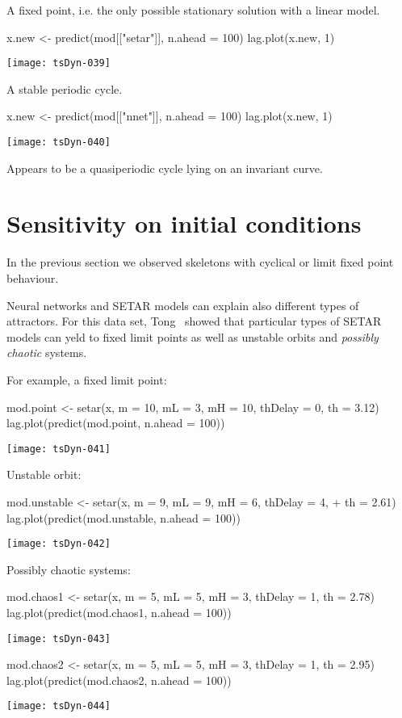 \documentclass[a4paper]{article}
\begin{document}
A fixed point, i.e. the only possible stationary solution with a linear model.
\begin{Schunk}
\begin{Sinput}
 x.new <- predict(mod[["setar"]], n.ahead = 100)
 lag.plot(x.new, 1)
\end{Sinput}
\end{Schunk}
\texttt{[image: tsDyn-039]}

A stable periodic cycle.

\begin{Schunk}
\begin{Sinput}
 x.new <- predict(mod[["nnet"]], n.ahead = 100)
 lag.plot(x.new, 1)
\end{Sinput}
\end{Schunk}
\texttt{[image: tsDyn-040]}

Appears to be a quasiperiodic cycle lying on an invariant curve.

\section{Sensitivity on initial conditions}
In the previous section we observed skeletons with cyclical or limit fixed point behaviour.

Neural networks and SETAR models can explain also different types of attractors.
For this data set, Tong~\cite{Tong1990} showed that particular types of SETAR models 
can yeld to fixed limit points as well as unstable orbits and \emph{possibly chaotic} systems.

For example, a fixed limit point:
\begin{Schunk}
\begin{Sinput}
 mod.point <- setar(x, m = 10, mL = 3, mH = 10, thDelay = 0, th = 3.12)
 lag.plot(predict(mod.point, n.ahead = 100))
\end{Sinput}
\end{Schunk}
\texttt{[image: tsDyn-041]}

Unstable orbit:
\begin{Schunk}
\begin{Sinput}
 mod.unstable <- setar(x, m = 9, mL = 9, mH = 6, thDelay = 4, 
+     th = 2.61)
 lag.plot(predict(mod.unstable, n.ahead = 100))
\end{Sinput}
\end{Schunk}
\texttt{[image: tsDyn-042]}

Possibly chaotic systems:
\begin{Schunk}
\begin{Sinput}
 mod.chaos1 <- setar(x, m = 5, mL = 5, mH = 3, thDelay = 1, th = 2.78)
 lag.plot(predict(mod.chaos1, n.ahead = 100))
\end{Sinput}
\end{Schunk}
\texttt{[image: tsDyn-043]}
\begin{Schunk}
\begin{Sinput}
 mod.chaos2 <- setar(x, m = 5, mL = 5, mH = 3, thDelay = 1, th = 2.95)
 lag.plot(predict(mod.chaos2, n.ahead = 100))
\end{Sinput}
\end{Schunk}
\texttt{[image: tsDyn-044]}
\end{document}
